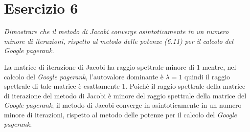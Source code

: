 
\section{Esercizio 6}
\label{sub:es6}
\emph{Dimostrare che il metodo di Jacobi converge asintoticamente in un numero minore di iterazioni, rispetto al metodo delle potenze (6.11) per il calcolo del \textit{Google pagerank}.}
\begin{sol}
  La matrice di iterazione di Jacobi ha raggio spettrale minore di 1 mentre, nel calcolo del \textsl{Google pagerank},
   l'autovalore dominante è $\lambda=1$ quindi il raggio spettrale di tale matrice è esattamente 1.
   Poiché il raggio spettrale della matrice di iterazione del metodo di Jacobi è minore del raggio spettrale della matrice del
   \textsl{Google pagerank}, il metodo di Jacobi converge in asintoticamente in un numero minore di iterazioni, rispetto al metodo delle potenze per il calcolo del \textsl{Google pagerank}.
\end{sol}


